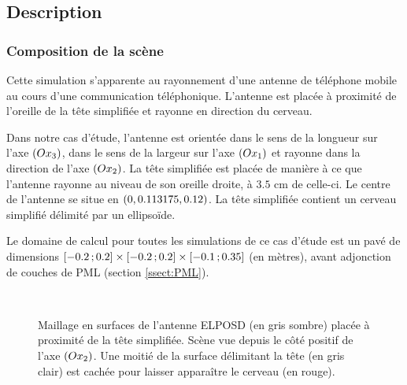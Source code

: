 \subsection{Description}
\label{ssect:tete_simplifiee_desc}


\subsubsection{Composition de la scène}

Cette simulation s'apparente au rayonnement d'une antenne de téléphone
mobile au cours d'une communication téléphonique.
L'antenne est placée à proximité de l'oreille de la tête simplifiée
et rayonne en direction du cerveau.

Dans notre cas d'étude, l'antenne est orientée dans le sens de la longueur
sur l'axe $(Ox_3)$, dans le sens de la largeur sur l'axe $(Ox_1)$
et rayonne dans la direction de l'axe $(Ox_2)$.
La tête simplifiée est placée de manière à ce que l'antenne rayonne
au niveau de son oreille droite, à $3.5$ cm de celle-ci.
Le centre de l'antenne se situe en $\left(0,0.113175,0.12\right)$.
La tête simplifiée contient un cerveau simplifié délimité par un ellipsoïde.

Le domaine de calcul pour toutes les simulations de ce cas d'étude est 
un pavé de dimensions
$\lbrack-0.2\,;0.2\rbrack \times \lbrack-0.2\,;0.2\rbrack \times
\lbrack-0.1\,;0.35\rbrack$ (en mètres), avant adjonction de
couches de PML (section \ref{ssect:PML}).


\begin{figure}[!h]
	\begin{center}
		\caption{
			\label{img:tete_elposd}
			Maillage en surfaces de l'antenne ELPOSD (en gris sombre)
			placée à proximité de la tête simplifiée.
			Scène vue depuis le côté positif de l'axe $(Ox_2)$.
			Une moitié de la surface délimitant la tête (en gris clair)
			est cachée pour laisser apparaître le cerveau (en rouge). 
		}
		
		\\
	\end{center}
\end{figure}



